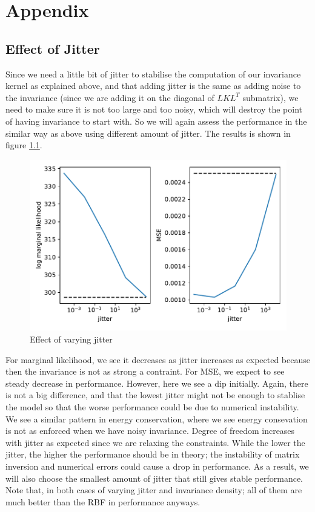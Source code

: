 \documentclass{statsmsc}
\begin{document}




\clearpage
\renewcommand*{\thepage}{A\arabic{page}}
\appendix

\chapter{Appendix}

\section{Effect of Jitter}
Since we need a little bit of jitter to stabilise the computation of our invariance kernel as explained above, and that adding jitter is the same as adding noise to the invariance (since we are adding it on the diagonal of $LKL^T$ submatrix), we need to make sure it is not too large and too noisy, which will destroy the point of having invariance to start with. 
So we will again assess the performance in the similar way as above using different amount of jitter.
The results is shown in figure \ref{fig:vary_jitter}.

\begin{figure}[H] 
  \includegraphics[width=0.8\linewidth]{../codes/figures/vary_jitter.pdf}
  \centering
  \caption{Effect of varying jitter}
  \label{fig:vary_jitter}
\end{figure}

For marginal likelihood, we see it decreases as jitter increases as expected because then the invariance is not as strong a contraint.
For MSE, we expect to see steady decrease in performance.
However, here we see a dip initially.
Again, there is not a big difference, and that the lowest jitter might not be enough to stablise the model so that the worse performance could be due to numerical instability.
We see a similar pattern in energy conservation, where we see energy consevation is not as enforced when we have noisy invariance.
Degree of freedom increases with jitter as expected since we are relaxing the constraints.
While the lower the jitter, the higher the performance should be in theory; the instability of matrix inversion and numerical errors could cause a drop in performance.
As a result,  we will also choose the smallest amount of jitter that still gives stable performance.  
Note that, in both cases of varying jitter and invariance density; all of them are much better than the RBF in performance anyways.
\end{document}
